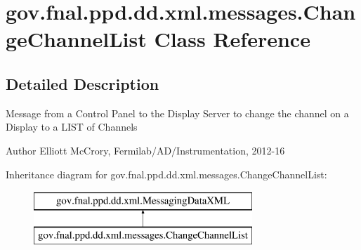 \hypertarget{classgov_1_1fnal_1_1ppd_1_1dd_1_1xml_1_1messages_1_1ChangeChannelList}{\section{gov.\-fnal.\-ppd.\-dd.\-xml.\-messages.\-Change\-Channel\-List Class Reference}
\label{classgov_1_1fnal_1_1ppd_1_1dd_1_1xml_1_1messages_1_1ChangeChannelList}
}


\subsection{Detailed Description}
Message from a Control Panel to the Display Server to change the channel on a Display to a L\-I\-S\-T of Channels

\begin{DoxyAuthor}{Author}
Elliott Mc\-Crory, Fermilab/\-A\-D/\-Instrumentation, 2012-\/16 
\end{DoxyAuthor}
Inheritance diagram for gov.\-fnal.\-ppd.\-dd.\-xml.\-messages.\-Change\-Channel\-List\-:\begin{figure}[H]
\begin{center}
\leavevmode
\includegraphics[height=2.000000cm]{classgov_1_1fnal_1_1ppd_1_1dd_1_1xml_1_1messages_1_1ChangeChannelList}
\end{center}
\end{figure}
